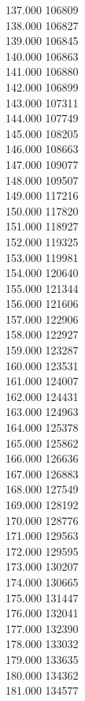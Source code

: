 { 137.000	106809 \\
 138.000	106827 \\
 139.000	106845 \\
 140.000	106863 \\
 141.000	106880 \\
 142.000	106899 \\
 143.000	107311 \\
 144.000	107749 \\
 145.000	108205 \\
 146.000	108663 \\
 147.000	109077 \\
 148.000	109507 \\
 149.000	117216 \\
 150.000	117820 \\
 151.000	118927 \\
 152.000	119325 \\
 153.000	119981 \\
 154.000	120640 \\
 155.000	121344 \\
 156.000	121606 \\
 157.000	122906 \\
 158.000	122927 \\
 159.000	123287 \\
 160.000	123531 \\
 161.000	124007 \\
 162.000	124431 \\
 163.000	124963 \\
 164.000	125378 \\
 165.000	125862 \\
 166.000	126636 \\
 167.000	126883 \\
 168.000	127549 \\
 169.000	128192 \\
 170.000	128776 \\
 171.000	129563 \\
 172.000	129595 \\
 173.000	130207 \\
 174.000	130665 \\
 175.000	131447 \\
 176.000	132041 \\
 177.000	132390 \\
 178.000	133032 \\
 179.000	133635 \\
 180.000	134362 \\
 181.000	134577 \\
}
